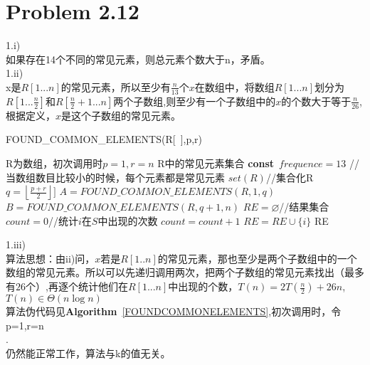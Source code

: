 \documentclass[twocolumn]{ctexart}
\begin{document}
\section*{Problem 2.12}
\noindent 1.i)\\
\indent 如果存在14个不同的常见元素，则总元素个数大于n，矛盾。\\
1.ii)\\
\indent x是$R[1...n]$的常见元素，所以至少有$\frac{n}{13}$个$x$在数组中，将数组$R[1...n]$划分为$R[1...\frac{n}{2}]$和$R[\frac{n}{2}+1...n]$两个子数组,则至少有一个子数组中的$x$的个数大于等于$\frac{n}{26}$,根据定义，$x$是这个子数组的常见元素。\\




\begin{algorithm}[htbp]	
	\caption{FOUND\_COMMON\_ELEMENTS(R[\ ],p,r)}
	\label{FOUNDCOMMONELEMENTS}
	\begin{algorithmic}[1]
		\REQUIRE R为数组，初次调用时$p=1,r=n$
		\ENSURE R中的常见元素集合
		\STATE \textbf{const}\ $frequence =13$
		\STATE //当数组数目比较小的时候，每个元素都是常见元素
		\RETURN $set(R)$//集合化R
		\ENDIF
		\STATE $q=\left\lfloor\frac{p+r}{2} \right\rfloor]$
		\STATE $A=FOUND\_COMMON\_ELEMENTS(R,1,q)$
		\STATE $B=FOUND\_COMMON\_ELEMENTS(R,q+1,n)$
		\STATE $RE=\varnothing$//结果集合
		\STATE $count=0$//统计$i$在$S$中出现的次数
		\STATE $count=count+1$
		\ENDIF
		\ENDFOR
		\STATE $RE=RE\cup\{i\}$
		\ENDIF
		\ENDFOR
		\RETURN RE
	\end{algorithmic}
\end{algorithm}
\noindent 1.iii)\\
\indent 算法思想：由ii)问，$x$若是$R[1..n]$的常见元素，那也至少是两个子数组中的一个数组的常见元素。所以可以先递归调用两次，把两个子数组的常见元素找出（最多有$26$个）,再逐个统计他们在$R[1...n]$中出现的个数，$T(n)=2T(\frac{n}{2})+26n$,$T(n) \in \Theta(n\log{n})$\\
\indent 算法伪代码见\textbf{Algorithm}\  \ref{FOUNDCOMMONELEMENTS},初次调用时，令p=1,r=n\\


.\\
\indent 仍然能正常工作，算法与k的值无关。\\
\end{document}
